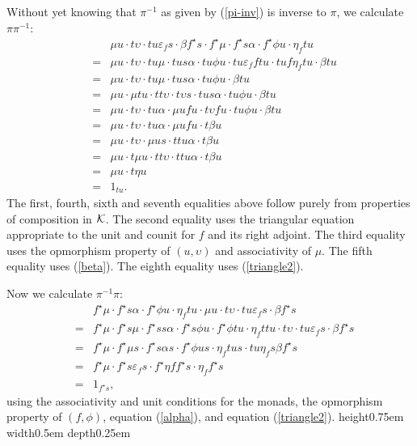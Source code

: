 \documentclass[a4paper,10pt]{article}
\newcommand{\qed}{\nobreak \ifvmode \relax \else
      \ifdim\lastskip<1.5em \hskip-\lastskip
      \hskip1.5em plus0em minus0.5em \fi \nobreak
      \vrule height0.75em width0.5em depth0.25em\fi}
\newenvironment{proof}[1][Proof]{\begin{trivlist}
\item[\hskip \labelsep {\bfseries #1}]}{\end{trivlist}}
\newcommand{\bk}{{\cal{K}}}
\numberwithin{equation}{section}
\begin{document}
\begin{proof} 
Without yet knowing that $\pi^{-1}$ as given by (\ref{pi-inv}) is inverse to $\pi$, we calculate $\pi \pi^{-1}$: 
\begin{eqnarray*}
&& \mu u \cdot t \upsilon \cdot tu \varepsilon_f s \cdot \beta f^{\star} s \cdot f^{\star} \mu \cdot f^{\star} s \alpha \cdot f^{\star} \phi u \cdot \eta_f tu \\
& = & \mu u \cdot t \upsilon \cdot tu \mu \cdot tus \alpha \cdot tu \phi u \cdot tu \varepsilon_f ftu \cdot tuf \eta_f tu \cdot \beta tu \\
& = & \mu u \cdot t \upsilon \cdot tu \mu \cdot tus \alpha \cdot tu \phi u \cdot \beta tu \\
& = & \mu u \cdot \mu tu \cdot tt \upsilon \cdot t \upsilon s \cdot tus \alpha \cdot tu \phi u \cdot \beta tu \\
& = & \mu u \cdot t \upsilon \cdot tu \alpha \cdot \mu ufu \cdot t \upsilon fu \cdot tu \phi u \cdot \beta tu \\
& = & \mu u \cdot t \upsilon \cdot tu \alpha \cdot \mu ufu \cdot t \beta u \\
& = & \mu u \cdot t \upsilon \cdot \mu us  \cdot ttu \alpha \cdot t \beta u \\
& = & \mu u \cdot t \mu u \cdot tt \upsilon  \cdot ttu \alpha \cdot t \beta u \\
& = & \mu u \cdot t \eta u \\
& = & 1_{tu}  .
\end{eqnarray*}
The first, fourth, sixth and seventh equalities above follow purely from properties of composition in $\bk$. The second equality uses the triangular equation appropriate to the unit and counit for $f$ and its right adjoint. The third equality uses the opmorphism property of $(u,\upsilon)$ and associativity of $\mu$. The fifth equality uses (\ref{beta}). The eighth equality uses (\ref{triangle2}).   

Now we calculate $\pi^{-1} \pi $: 
\begin{eqnarray*}
&& f^{\star} \mu \cdot f^{\star} s \alpha \cdot f^{\star} \phi u \cdot \eta_f tu \cdot \mu u \cdot t \upsilon \cdot tu \varepsilon_f s \cdot \beta f^{\star} s \\
& = & f^{\star} \mu \cdot f^{\star} s \mu \cdot f^{\star} ss \alpha \cdot f^{\star} s \phi u \cdot f^{\star} \phi tu \cdot \eta_f ttu \cdot t \upsilon \cdot tu \varepsilon_f s  \cdot \beta f^{\star} s \\
& = & f^{\star} \mu \cdot f^{\star} \mu s \cdot f^{\star} s \alpha s \cdot f^{\star} \phi us \cdot \eta_f tus \cdot tu \eta_f s \beta f^{\star} s \\
& = & f^{\star} \mu \cdot f^{\star} s \varepsilon_f s \cdot f^{\star} \eta f f^{\star} s \cdot \eta_f f^{\star}s \\
& = & 1_{f^{\star} s}  ,
\end{eqnarray*}
using the associativity and unit conditions for the monads, the opmorphism property of $(f,\phi)$, equation (\ref{alpha}), and equation (\ref{triangle2}).   \qed

\end{proof}
\end{document}
